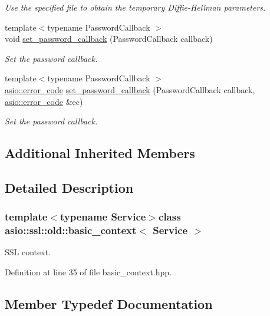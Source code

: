 \begin{DoxyCompactItemize}
\begin{DoxyCompactList}\small\item\em Use the specified file to obtain the temporary Diffie-\/\+Hellman parameters. \end{DoxyCompactList}\item 
{\footnotesize template$<$typename Password\+Callback $>$ }\\void \hyperlink{classasio_1_1ssl_1_1old_1_1basic__context_ac00aca94f19f86adc11bdb32a7732680}{set\+\_\+password\+\_\+callback} (Password\+Callback callback)
\begin{DoxyCompactList}\small\item\em Set the password callback. \end{DoxyCompactList}\item 
{\footnotesize template$<$typename Password\+Callback $>$ }\\\hyperlink{classasio_1_1error__code}{asio\+::error\+\_\+code} \hyperlink{classasio_1_1ssl_1_1old_1_1basic__context_a39c12b35626e5ad52b82a51c3074b181}{set\+\_\+password\+\_\+callback} (Password\+Callback callback, \hyperlink{classasio_1_1error__code}{asio\+::error\+\_\+code} \&ec)
\begin{DoxyCompactList}\small\item\em Set the password callback. \end{DoxyCompactList}\end{DoxyCompactItemize}
\subsection*{Additional Inherited Members}


\subsection{Detailed Description}
\subsubsection*{template$<$typename Service$>$class asio\+::ssl\+::old\+::basic\+\_\+context$<$ Service $>$}

S\+S\+L context. 

Definition at line 35 of file basic\+\_\+context.\+hpp.



\subsection{Member Typedef Documentation}
\hypertarget{classasio_1_1ssl_1_1old_1_1basic__context_a0ab28e5a1f4db7dbf190e6bb8931031a}{}
